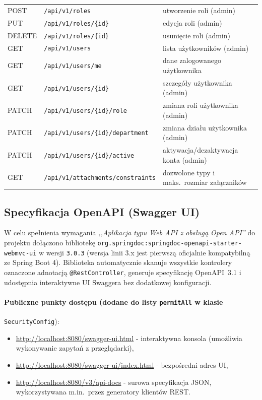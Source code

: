 \documentclass[12pt,a4paper]{article}
\begin{document}
\begin{longtable}{@{}l >{\raggedright\arraybackslash}p{} >{\raggedright\arraybackslash}p{}@{}}
  POST & \nolinkurl{/api/v1/roles} & \small{utworzenie roli (admin)} \\ \addlinespace
  PUT & \nolinkurl{/api/v1/roles/{id}} & \small{edycja roli (admin)} \\ \addlinespace
  DELETE & \nolinkurl{/api/v1/roles/{id}} & \small{usunięcie roli (admin)} \\
  \midrule
  GET & \nolinkurl{/api/v1/users} & \small{lista użytkowników (admin)} \\ \addlinespace
  GET & \nolinkurl{/api/v1/users/me} & \small{dane zalogowanego użytkownika} \\ \addlinespace
  GET & \nolinkurl{/api/v1/users/{id}} & \small{szczegóły użytkownika (admin)} \\ \addlinespace
  PATCH & \nolinkurl{/api/v1/users/{id}/role} & \small{zmiana roli użytkownika (admin)} \\ \addlinespace
  PATCH & \nolinkurl{/api/v1/users/{id}/department} & \small{zmiana działu użytkownika (admin)} \\ \addlinespace
  PATCH & \nolinkurl{/api/v1/users/{id}/active} & \small{aktywacja/dezaktywacja konta (admin)} \\
  \midrule
  GET & \nolinkurl{/api/v1/attachments/constraints} & \small{dozwolone typy i maks.\ rozmiar załączników} \\
\end{longtable}


\subsection{Specyfikacja OpenAPI (Swagger UI)}
W celu spełnienia wymagania \emph{,,Aplikacja typu Web API z obsługą Open API''}
do projektu dołączono bibliotekę
\texttt{org.springdoc:springdoc-openapi-starter-webmvc-ui} w wersji \texttt{3.0.3}
(wersja linii 3.x jest pierwszą oficjalnie kompatybilną ze Spring Boot 4).
Biblioteka automatycznie skanuje wszystkie kontrolery oznaczone adnotacją
\texttt{@RestController}, generuje specyfikację OpenAPI~3.1 i udostępnia
interaktywne UI Swaggera bez dodatkowej konfiguracji.

\paragraph{Publiczne punkty dostępu (dodane do listy \texttt{permitAll} w klasie}
\texttt{SecurityConfig}):
\begin{itemize}[leftmargin=*]
  \item \url{http://localhost:8080/swagger-ui.html} - interaktywna konsola
        (umożliwia wykonywanie zapytań z przeglądarki),
  \item \url{http://localhost:8080/swagger-ui/index.html} - bezpośredni adres UI,
  \item \url{http://localhost:8080/v3/api-docs} - surowa specyfikacja JSON,
        wykorzystywana m.in.\ przez generatory klientów REST.
\end{itemize}
\end{document}
